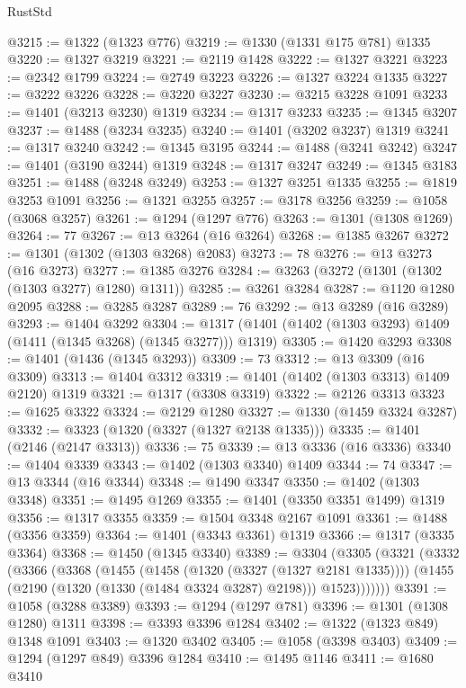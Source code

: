\begin{lexlean}{RustStd}
\begin{coremodule}
{\begin{coremodule}
{{{{{{{{{{{{{{{{{{{{{{{{{{{{{{{{{{{{{{@3215 := @1322 (@1323 @776)
@3219 := @1330 (@1331 @175 @781) @1335
@3220 := @1327 @3219
@3221 := @2119 @1428
@3222 := @1327 @3221
@3223 := @2342 @1799
@3224 := @2749 @3223
@3226 := @1327 @3224 @1335
@3227 := @3222 @3226
@3228 := @3220 @3227
@3230 := @3215 @3228 @1091
@3233 := @1401 (@3213 @3230) @1319
@3234 := @1317 @3233
@3235 := @1345 @3207
@3237 := @1488 (@3234 @3235)
@3240 := @1401 (@3202 @3237) @1319
@3241 := @1317 @3240
@3242 := @1345 @3195
@3244 := @1488 (@3241 @3242)
@3247 := @1401 (@3190 @3244) @1319
@3248 := @1317 @3247
@3249 := @1345 @3183
@3251 := @1488 (@3248 @3249)
@3253 := @1327 @3251 @1335
@3255 := @1819 @3253 @1091
@3256 := @1321 @3255
@3257 := @3178 @3256
@3259 := @1058 (@3068 @3257)
@3261 := @1294 (@1297 @776)
@3263 := @1301 (@1308 @1269)
@3264 := 77
@3267 := @13 @3264 (@16 @3264)
@3268 := @1385 @3267
@3272 := @1301 (@1302 (@1303 @3268) @2083)
@3273 := 78
@3276 := @13 @3273 (@16 @3273)
@3277 := @1385 @3276
@3284 := @3263 (@3272 (@1301 (@1302 (@1303 @3277) @1280) @1311))
@3285 := @3261 @3284
@3287 := @1120 @1280 @2095
@3288 := @3285 @3287
@3289 := 76
@3292 := @13 @3289 (@16 @3289)
@3293 := @1404 @3292
@3304 := @1317 (@1401 (@1402 (@1303 @3293) @1409 (@1411 (@1345 @3268) (@1345 @3277))) @1319)
@3305 := @1420 @3293
@3308 := @1401 (@1436 (@1345 @3293))
@3309 := 73
@3312 := @13 @3309 (@16 @3309)
@3313 := @1404 @3312
@3319 := @1401 (@1402 (@1303 @3313) @1409 @2120) @1319
@3321 := @1317 (@3308 @3319)
@3322 := @2126 @3313
@3323 := @1625 @3322
@3324 := @2129 @1280
@3327 := @1330 (@1459 @3324 @3287)
@3332 := @3323 (@1320 (@3327 (@1327 @2138 @1335)))
@3335 := @1401 (@2146 (@2147 @3313))
@3336 := 75
@3339 := @13 @3336 (@16 @3336)
@3340 := @1404 @3339
@3343 := @1402 (@1303 @3340) @1409
@3344 := 74
@3347 := @13 @3344 (@16 @3344)
@3348 := @1490 @3347
@3350 := @1402 (@1303 @3348)
@3351 := @1495 @1269
@3355 := @1401 (@3350 @3351 @1499) @1319
@3356 := @1317 @3355
@3359 := @1504 @3348 @2167 @1091
@3361 := @1488 (@3356 @3359)
@3364 := @1401 (@3343 @3361) @1319
@3366 := @1317 (@3335 @3364)
@3368 := @1450 (@1345 @3340)
@3389 := @3304
    (@3305
      (@3321
        (@3332
          (@3366
            (@3368
              (@1455
                (@1458 (@1320 (@3327 (@1327 @2181 @1335))))
                (@1455 (@2190 (@1320 (@1330 (@1484 @3324 @3287) @2198))) @1523)))))))
@3391 := @1058 (@3288 @3389)
@3393 := @1294 (@1297 @781)
@3396 := @1301 (@1308 @1280) @1311
@3398 := @3393 @3396 @1284
@3402 := @1322 (@1323 @849) @1348 @1091
@3403 := @1320 @3402
@3405 := @1058 (@3398 @3403)
@3409 := @1294 (@1297 @849) @3396 @1284
@3410 := @1495 @1146
@3411 := @1680 @3410
}}}}}}}}}}}}}}}}}}}}}}}}}}}}}}}}}}}}}}
\end{coremodule}}
\end{coremodule}
\end{lexlean}
